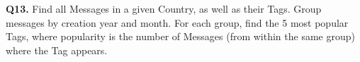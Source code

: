 \textbf{Q13.}
Find all Messages in a given Country, as well as their Tags.
Group messages by creation year and month. For each group, find the 5
most popular Tags, where popularity is the number of Messages (from
within the same group) where the Tag appears.
